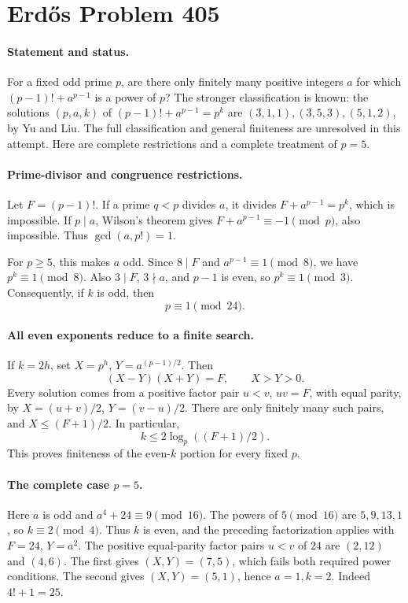 \section*{Erd\H{o}s Problem 405}

\paragraph{Statement and status.}
For a fixed odd prime \(p\), are there only finitely many positive integers
\(a\) for which \((p-1)!+a^{p-1}\) is a power of \(p\)?
The stronger classification is known: the solutions \((p,a,k)\) of
\((p-1)!+a^{p-1}=p^k\) are
\((3,1,1),(3,5,3),(5,1,2)\), by Yu and Liu.
The full classification and general finiteness are unresolved in this
attempt. Here are complete restrictions and a complete treatment of \(p=5\).

\paragraph{Prime-divisor and congruence restrictions.}
Let \(F=(p-1)!\). If a prime \(q<p\) divides \(a\), it divides
\(F+a^{p-1}=p^k\), which is impossible. If \(p\mid a\), Wilson's theorem
gives \(F+a^{p-1}\equiv-1\pmod p\), also impossible. Thus
\(\gcd(a,p!)=1\).

For \(p\geq5\), this makes \(a\) odd. Since \(8\mid F\) and
\(a^{p-1}\equiv1\pmod8\), we have \(p^k\equiv1\pmod8\).
Also \(3\mid F\), \(3\nmid a\), and \(p-1\) is even, so
\(p^k\equiv1\pmod3\). Consequently, if \(k\) is odd, then
\[
 p\equiv1\pmod{24}.
 \tag{1}
\]

\paragraph{All even exponents reduce to a finite search.}
If \(k=2h\), set \(X=p^h\), \(Y=a^{(p-1)/2}\). Then
\[
 (X-Y)(X+Y)=F,\qquad X>Y>0.
\]
Every solution comes from a positive factor pair \(u<v\), \(uv=F\),
with equal parity, by \(X=(u+v)/2\), \(Y=(v-u)/2\).
There are only finitely many such pairs, and
\(X\leq(F+1)/2\). In particular,
\[
 k\leq2\log_p((F+1)/2).
\]
This proves finiteness of the even-\(k\) portion for every fixed \(p\).

\paragraph{The complete case \(p=5\).}
Here \(a\) is odd and \(a^4+24\equiv9\pmod{16}\).
The powers of \(5\pmod{16}\) are \(5,9,13,1\), so \(k\equiv2\pmod4\).
Thus \(k\) is even, and the preceding factorization applies with
\(F=24\), \(Y=a^2\). The positive equal-parity factor pairs \(u<v\)
of \(24\) are \((2,12)\) and \((4,6)\). The first gives
\((X,Y)=(7,5)\), which fails both required power conditions.
The second gives \((X,Y)=(5,1)\), hence \(a=1,k=2\).
Indeed \(4!+1=25\).

